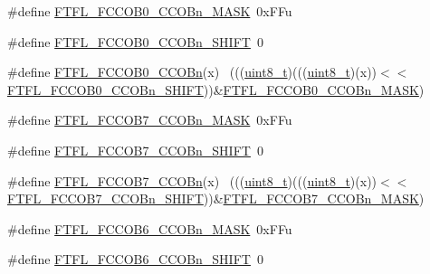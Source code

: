 \begin{DoxyCompactItemize}
\item 
\#define \hyperlink{group___f_t_f_l___register___masks_ga082d4e11b8428b51a725109ad01033b3}{F\+T\+F\+L\+\_\+\+F\+C\+C\+O\+B0\+\_\+\+C\+C\+O\+Bn\+\_\+\+M\+A\+SK}~0x\+F\+Fu
\item 
\#define \hyperlink{group___f_t_f_l___register___masks_gae39ca8b6f1b8ecf1ba987b7f8590abc7}{F\+T\+F\+L\+\_\+\+F\+C\+C\+O\+B0\+\_\+\+C\+C\+O\+Bn\+\_\+\+S\+H\+I\+FT}~0
\item 
\#define \hyperlink{group___f_t_f_l___register___masks_ga9a3708fcea926c778ee3e19a40381b37}{F\+T\+F\+L\+\_\+\+F\+C\+C\+O\+B0\+\_\+\+C\+C\+O\+Bn}(x)                                      ~(((\hyperlink{_p_e___types_8h_aba7bc1797add20fe3efdf37ced1182c5}{uint8\+\_\+t})(((\hyperlink{_p_e___types_8h_aba7bc1797add20fe3efdf37ced1182c5}{uint8\+\_\+t})(x))$<$$<$\hyperlink{group___f_t_f_l___register___masks_gae39ca8b6f1b8ecf1ba987b7f8590abc7}{F\+T\+F\+L\+\_\+\+F\+C\+C\+O\+B0\+\_\+\+C\+C\+O\+Bn\+\_\+\+S\+H\+I\+FT}))\&\hyperlink{group___f_t_f_l___register___masks_ga082d4e11b8428b51a725109ad01033b3}{F\+T\+F\+L\+\_\+\+F\+C\+C\+O\+B0\+\_\+\+C\+C\+O\+Bn\+\_\+\+M\+A\+SK})
\item 
\#define \hyperlink{group___f_t_f_l___register___masks_ga78bd2db54cf04b71ad38d7ff8fb37140}{F\+T\+F\+L\+\_\+\+F\+C\+C\+O\+B7\+\_\+\+C\+C\+O\+Bn\+\_\+\+M\+A\+SK}~0x\+F\+Fu
\item 
\#define \hyperlink{group___f_t_f_l___register___masks_ga9db7fcb10dd892310bfb18e5448bba95}{F\+T\+F\+L\+\_\+\+F\+C\+C\+O\+B7\+\_\+\+C\+C\+O\+Bn\+\_\+\+S\+H\+I\+FT}~0
\item 
\#define \hyperlink{group___f_t_f_l___register___masks_ga39071af629fbe0bebebfbaebe707472c}{F\+T\+F\+L\+\_\+\+F\+C\+C\+O\+B7\+\_\+\+C\+C\+O\+Bn}(x)                                      ~(((\hyperlink{_p_e___types_8h_aba7bc1797add20fe3efdf37ced1182c5}{uint8\+\_\+t})(((\hyperlink{_p_e___types_8h_aba7bc1797add20fe3efdf37ced1182c5}{uint8\+\_\+t})(x))$<$$<$\hyperlink{group___f_t_f_l___register___masks_ga9db7fcb10dd892310bfb18e5448bba95}{F\+T\+F\+L\+\_\+\+F\+C\+C\+O\+B7\+\_\+\+C\+C\+O\+Bn\+\_\+\+S\+H\+I\+FT}))\&\hyperlink{group___f_t_f_l___register___masks_ga78bd2db54cf04b71ad38d7ff8fb37140}{F\+T\+F\+L\+\_\+\+F\+C\+C\+O\+B7\+\_\+\+C\+C\+O\+Bn\+\_\+\+M\+A\+SK})
\item 
\#define \hyperlink{group___f_t_f_l___register___masks_gad2e7d2a86141cb1cd93c20f49ccb9299}{F\+T\+F\+L\+\_\+\+F\+C\+C\+O\+B6\+\_\+\+C\+C\+O\+Bn\+\_\+\+M\+A\+SK}~0x\+F\+Fu
\item 
\#define \hyperlink{group___f_t_f_l___register___masks_gae2e3b638ebffcc78278d4901209fa7cf}{F\+T\+F\+L\+\_\+\+F\+C\+C\+O\+B6\+\_\+\+C\+C\+O\+Bn\+\_\+\+S\+H\+I\+FT}~0

\end{DoxyCompactItemize}
